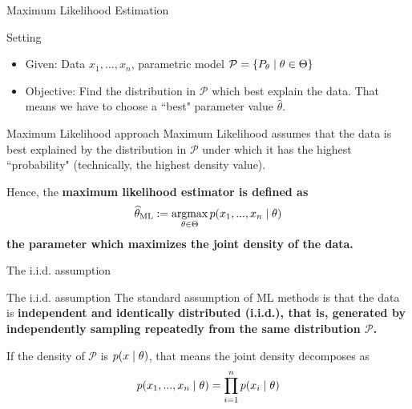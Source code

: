 \documentclass[10pt]{beamer}
\begin{document}
\begin{frame}{Maximum Likelihood Estimation}
\begin{sblock}{Setting}
\begin{itemize}
\item Given: Data $x_1, ..., x_n$, parametric model $\mathcal{P} = \{ {P_\theta \; | \; \theta \in \Theta} \}$
\item Objective: Find the distribution in $\mathcal{P}$ which best explain the data.  That means we have to choose a ``best" parameter value $\widehat{\theta}$.
\end{itemize}
\end{sblock}

\begin{sblock}{Maximum Likelihood approach}
Maximum Likelihood assumes that the data is best explained by the distribution in $\mathcal{P}$ under which it has the highest ``probability" (technically, the highest density value).

Hence, the \bf{maximum likelihood estimator} is defined as
\[ \widehat{\theta}_{\text{ML}} := \operatorname*{argmax}_{\theta \in \Theta} p(x_1, ..., x_n \; | \; \theta) \]
the parameter which maximizes the joint density of the data.
\end{sblock}

\end{frame}


\begin{frame}{The i.i.d. assumption}

\begin{sblock}{The i.i.d. assumption}
The standard assumption of ML methods is that the data is \bf{independent and identically distributed (i.i.d.)}, that is, generated by independently sampling repeatedly from the same distribution $\mathcal{P}$. 

If the density of $\mathcal{P}$ is $p(x \; | \; \theta)$, that means the joint density decomposes as 
\[  p(x_1, ..., x_n \; | \; \theta) = \displaystyle\prod_{i=1}^n p(x_i \; | \; \theta) \]
\end{sblock}

\end{frame}
\end{document}
